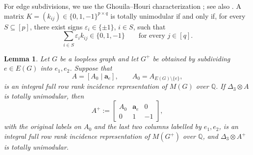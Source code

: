 \documentclass[12pt,a4paper]{article}
\numberwithin{equation}{section}
\newcommand{\QQ}{\mathbb Q}
\newtheorem{lemma}[lemma]{Lemma}
\theoremstyle{definition}
\theoremstyle{remark}
\begin{document}
For edge subdivisions, we use the Ghouila--Houri characterization
\cite{ghouila-houri}; see also
\cite[Corollary~4.7]{conforti-integer-programming}.  A matrix
\(K=(k_{ij})\in\{0,1,-1\}^{p\times q}\) is totally unimodular if
and only if, for every \(S\subseteq[p]\), there exist signs
\(\varepsilon_i\in\{\pm1\}\), \(i\in S\), such that
\begin{equation}\label{eq:ghouila-houri}
  \sum_{i\in S}\varepsilon_i k_{ij}\in\{0,1,-1\}
  \qquad\text{for every }j\in[q].
\end{equation}
\begin{lemma}
\label{lem:triangle-subdivision-tu}
Let \(G\) be a loopless graph and let \(G^+\) be obtained by
subdividing \(e\in E(G)\) into \(e_1,e_2\).  Suppose that
\[
 A=[A_0\mid\boldsymbol a_e],\qquad
 A_0=A_{E(G)\setminus\{e\}},
\]
is an integral full row rank incidence representation of \(M(G)\)
over \(\QQ\).  If \(\Delta_3\otimes A\) is totally unimodular, then
\begin{equation}\label{eq:subdivision-incidence-representation}
 A^+:=
 \begin{bmatrix}
  A_0&\boldsymbol a_e&0\\
  0&1&-1
 \end{bmatrix},
\end{equation}
with the original labels on \(A_0\) and the last two columns
labelled by \(e_1,e_2\), is an integral full row rank incidence
representation of \(M(G^+)\) over \(\QQ\), and
\(\Delta_3\otimes A^+\) is totally unimodular.
\end{lemma}
\end{document}
